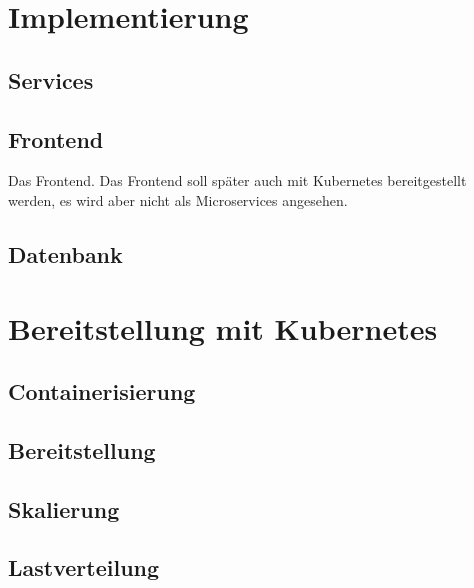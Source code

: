 \section{Implementierung}

\subsection{Services}

\subsection{Frontend}

Das Frontend. Das Frontend soll später auch mit Kubernetes bereitgestellt werden, es wird aber nicht als Microservices angesehen.

\subsection{Datenbank}

\section{Bereitstellung mit Kubernetes}

\subsection{Containerisierung}

\subsection{Bereitstellung}

\subsection{Skalierung}

\subsection{Lastverteilung}

